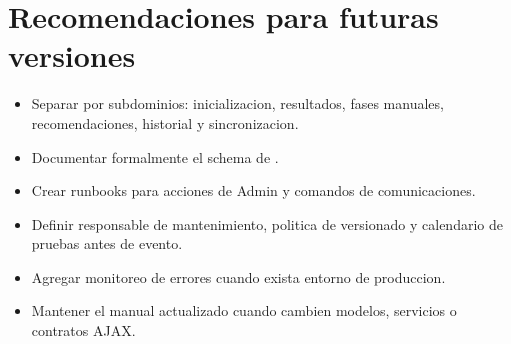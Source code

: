 \section{Recomendaciones para futuras versiones}
\label{sec:mantenimiento-recomendaciones}

\begin{itemize}
  \item Separar  por subdominios: inicializacion, resultados, fases manuales, recomendaciones, historial y sincronizacion.
  \item Documentar formalmente el schema de .
  \item Crear runbooks para acciones de Admin y comandos de comunicaciones.
  \item Definir responsable de mantenimiento, politica de versionado y calendario de pruebas antes de evento.
  \item Agregar monitoreo de errores cuando exista entorno de produccion.
  \item Mantener el manual actualizado cuando cambien modelos, servicios o contratos AJAX.
\end{itemize}
